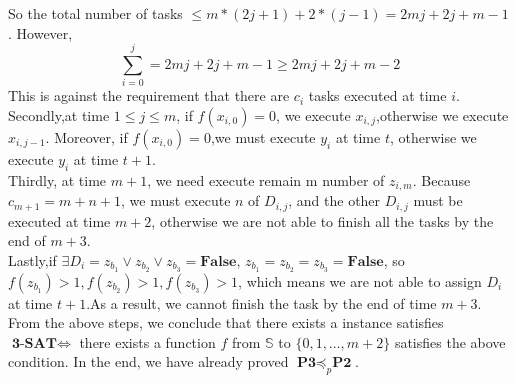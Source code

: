     So the total number of tasks $\le m*(2j+1)+2*(j-1)=2mj+2j+m-1$. However,
    \begin{equation}
        \sum_{i=0}^{j}=2mj+2j+m-1\ge2mj+2j+m-2
    \end{equation}
    This is against the requirement that there are $c_i$ tasks executed at time $i$.\\
    Secondly,at time $1\le j\le m$, if $f(x_{i,0})=0$, we execute $x_{i,j}$,otherwise we execute $x_{i,j-1}$. Moreover, if $f(x_{i,0})=0$,we must execute $y_i$ at time $t$, otherwise we execute $y_i$ at time $t+1$.\\
    Thirdly, at time $m+1$, we need execute remain m number of $z_{i,m}$. Because $c_{m+1}=m+n+1$, we must execute $n$ of $D_{i,j}$, and the other $D_{i,j}$ must be executed at time $m+2$, otherwise we are not able to finish all the tasks by the end of $m+3$.\\
    Lastly,if $\exists D_i=z_{b_1}\vee z_{b_2}\vee z_{b_3}=\textbf{False}$, $z_{b_1}=z_{b_2}=z_{b_3}=\textbf{False}$, so $f(z_{b_1})>1,f(z_{b_2})>1,f(z_{b_3})>1$, which means we are not able to assign $D_i$ at time $t+1$.As a result, we cannot finish the task by the end of time $m+3$.\\
    From the above steps, we conclude that there exists a instance satisfies  $\textbf{3-SAT}\Leftrightarrow$ there exists a function $f$ from $\mathbb{S}$ to $\{0,1,\dots,m+2\}$ satisfies the above condition. In the end, we have already proved $\textbf{P3}\preceq_p \textbf{P2}$.
    
    
